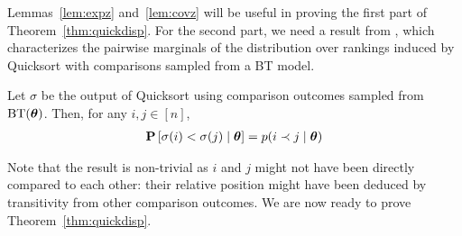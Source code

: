 Lemmas~\ref{lem:expz} and~\ref{lem:covz} will be useful in proving the first part of Theorem~\ref{thm:quickdisp}.
For the second part, we need a result from \citet{ailon2008reconciling}, which characterizes the pairwise marginals of the distribution over rankings induced by Quicksort with comparisons sampled from a BT model.

\begin{theorem}
\label{thm:stability}
Let $\sigma$ be the output of Quicksort using comparison outcomes sampled from $\operatorname{BT}(\bm{\theta})$.
Then, for any $i, j \in [n]$,
\begin{align*}
\mathbf{P}\left[ \sigma(i) < \sigma(j) \mid \bm{\theta} \right] = p(i \prec j \mid \bm{\theta})
\end{align*}
\end{theorem}

Note that the result is non-trivial as $i$ and $j$ might not have been directly compared to each other: their relative position might have been deduced by transitivity from other comparison outcomes.
We are now ready to prove Theorem~\ref{thm:quickdisp}.

